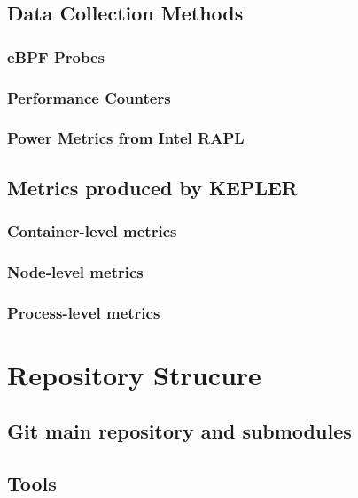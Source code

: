 \subsection{Data Collection Methods}
\subsubsection{eBPF Probes}
\subsubsection{Performance Counters}
\subsubsection{Power Metrics from Intel RAPL}
\subsection{Metrics produced by KEPLER}
\subsubsection{Container-level metrics}
\subsubsection{Node-level metrics}
\subsubsection{Process-level metrics}


\section{Repository Strucure}
\subsection{Git main repository and submodules}
\subsection{Tools}